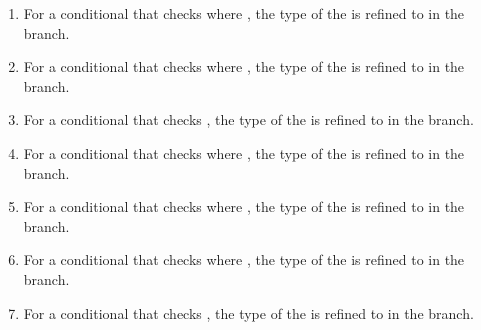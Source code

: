 \begin{enumerate}
    \item For a conditional that checks  where ,
    the type of the  is refined to  in the  branch.
    \item For a conditional that checks  where ,
    the type of the  is refined to  in the  branch.
    \item For a conditional that checks ,
    the type of the  is refined to  in the  branch.
    \item For a conditional that checks  where ,
    the type of the  is refined to  in the  branch.
    \item For a conditional that checks  where ,
    the type of the  is refined to  in the  branch.
    \item For a conditional that checks  where ,
    the type of the  is refined to  in the  branch.
    \item For a conditional that checks ,
    the type of the  is refined to  in the  branch.
\end{enumerate}

